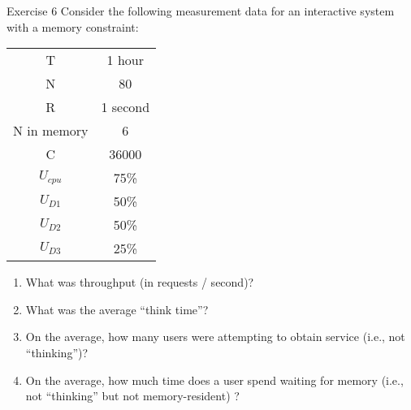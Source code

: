 \documentclass[]{beamer}
\begin{document}
\begin{frame}[allowframebreaks]{Exercise 6 \cite{lazowska1984quantitative}}
Consider the following measurement data for an interactive system
with a memory constraint:

\begin{tabular}{cc}
	T	&	1 hour	\\
	N	&	80	\\
	R	&	1 second	\\
	N in memory	&	6	\\
	C	&	36000	\\
	$U_{cpu}$	&	75\%	\\
	$U_{D1}$	&	50\%	\\
	$U_{D2}$	&	50\%	\\
	$U_{D3}$	&	25\%	\\
\end{tabular}
\break
\begin{enumerate}
	\item What was throughput (in requests / second)?
	\item What was the average ``think time''?
	\item On the average, how many users were attempting to obtain service
	(i.e., not ``thinking'')?
	\item On the average, how much time does a user spend waiting for
	memory (i.e., not ``thinking'' but not memory-resident) ?
\end{enumerate}
\end{frame}
\end{document}
